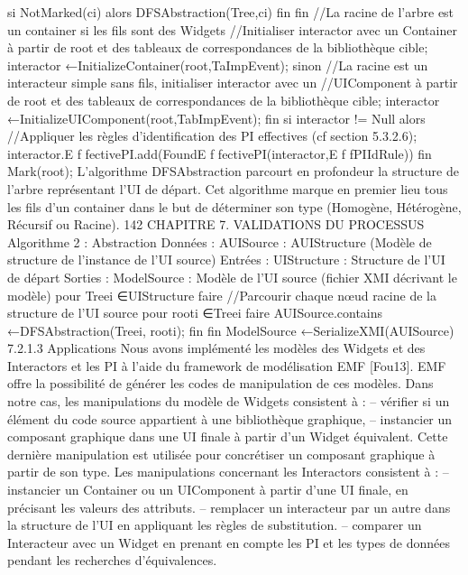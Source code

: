 \documentclass{article}
\begin{document}
si NotMarked(ci) alors
DFSAbstraction(Tree,ci)
ﬁn
ﬁn
//La racine de l’arbre est un container si les ﬁls sont des Widgets //Initialiser interactor avec
un Container \`{a} partir de root et des tableaux de correspondances de la biblioth\`{e}que cible;
interactor ←InitializeContainer(root,TaImpEvent);
sinon
//La racine est un interacteur simple sans ﬁls, initialiser interactor avec un //UIComponent
\`{a} partir de root et des tableaux de correspondances de la biblioth\`{e}que cible;
interactor ←InitializeUIComponent(root,TabImpEvent);
ﬁn
si interactor != Null alors
//Appliquer les r\`{e}gles d’identiﬁcation des PI effectives (cf section 5.3.2.6);
interactor.E f fectivePI.add(FoundE f fectivePI(interactor,E f fPIIdRule))
ﬁn
Mark(root);
L’algorithme DFSAbstraction parcourt en profondeur la structure de l’arbre repr\'{e}sentant l’UI de
d\'{e}part. Cet algorithme marque en premier lieu tous les ﬁls d’un container dans le but de d\'{e}terminer
son type (Homog\`{e}ne, H\'{e}t\'{e}rog\`{e}ne, R\'{e}cursif ou Racine).
142
CHAPITRE 7. VALIDATIONS DU PROCESSUS
Algorithme 2 : Abstraction
Donn\'{e}es : AUISource : AUIStructure (Mod\`{e}le de structure de l’instance de l’UI source)
Entr\'{e}es : UIStructure : Structure de l’UI de d\'{e}part
Sorties : ModelSource : Mod\`{e}le de l’UI source (ﬁchier XMI d\'{e}crivant le mod\`{e}le)
pour Treei ∈UIStructure faire
//Parcourir chaque nœud racine de la structure de l’UI source
pour rooti ∈Treei faire
AUISource.contains ←DFSAbstraction(Treei, rooti);
ﬁn
ﬁn
ModelSource ←SerializeXMI(AUISource)
7.2.1.3
Applications
Nous avons impl\'{e}ment\'{e} les mod\`{e}les des Widgets et des Interactors et les PI \`{a} l’aide du framework
de mod\'{e}lisation EMF [Fou13]. EMF offre la possibilit\'{e} de g\'{e}n\'{e}rer les codes de manipulation de ces
mod\`{e}les. Dans notre cas, les manipulations du mod\`{e}le de Widgets consistent \`{a} :
– v\'{e}riﬁer si un \'{e}l\'{e}ment du code source appartient \`{a} une biblioth\`{e}que graphique,
– instancier un composant graphique dans une UI ﬁnale \`{a} partir d’un Widget \'{e}quivalent.
Cette derni\`{e}re manipulation est utilis\'{e}e pour concr\'{e}tiser un composant graphique \`{a} partir de son type.
Les manipulations concernant les Interactors consistent \`{a} :
– instancier un Container ou un UIComponent \`{a} partir d’une UI ﬁnale, en pr\'{e}cisant les valeurs
des attributs.
– remplacer un interacteur par un autre dans la structure de l’UI en appliquant les r\`{e}gles de substitution.
– comparer un Interacteur avec un Widget en prenant en compte les PI et les types de donn\'{e}es
pendant les recherches d’\'{e}quivalences.
\end{document}
